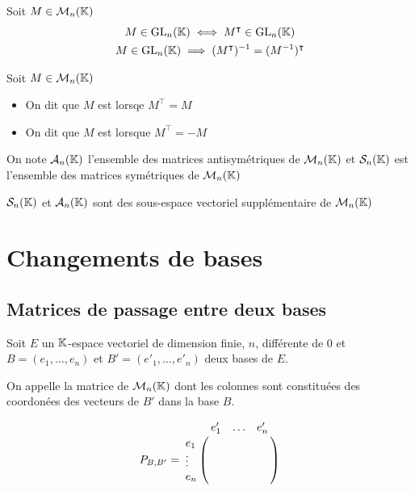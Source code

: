\begin{prp}
Soit $M \in \operatorname{\mathcal{M}}_n(\mathbb{K})$
\begin{gather*}
    M \in \mathrm{GL}_n(\mathbb{K}) \iff M^\intercal \in \mathrm{GL}_n(\mathbb{K}) \\
    M \in \mathrm{GL}_n(\mathbb{K}) \implies (M^\intercal)^{-1} =
    (M^{-1})^\intercal
\end{gather*}
\end{prp}

\begin{dfn}
Soit $M \in \operatorname{\mathcal{M}}_n(\mathbb{K})$
\begin{itemize}
    \item On dit que $M$ est  lorsqe $M^\intercal = M$
    \item On dit que $M$ est  lorsque $M^\intercal = -M$
\end{itemize}
On note $\mathcal{A}_n(\mathbb{K})$ l'ensemble des matrices antisymétriques de $\operatorname{\mathcal{M}}_n(\mathbb{K})$
et $\mathcal{S}_n(\mathbb{K})$ est l'ensemble des matrices symétriques de $\operatorname{\mathcal{M}}_n(\mathbb{K})$
\end{dfn}

\begin{prp}
$\mathcal{S}_n(\mathbb{K})$ et $\mathcal{A}_n(\mathbb{K})$ sont des sous-espace vectoriel
supplémentaire de $\operatorname{\mathcal{M}}_n(\mathbb{K})$
\end{prp}



\section{Changements de bases}


\subsection{Matrices de passage entre deux bases}

\begin{dfn}
Soit $E$ un $\mathbb{K}$-espace vectoriel de dimension finie, $n$, différente de $0$
et $B = (e_1, \ldots, e_n)$ et $B' = (e'_1, \ldots, e'_n)$ deux bases de $E$.

On appelle  la matrice de $\operatorname{\mathcal{M}}_n(\mathbb{K})$ 
dont les colonnes sont constituées des coordonées des vecteurs de $B'$ dans
la base $B$.

\[
    P_{B, B'} =
    \bordermatrix{ 
        ~       & e'_1  & \ldots    & e'_n  \cr
        e_1     & ~     & ~         & ~     \cr
        \vdots  & ~     & ~         & ~     \cr
        e_n     & ~     & ~         & ~     \cr
   }
\]
\end{dfn}


